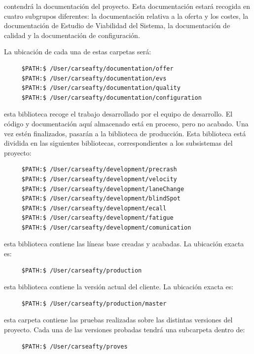\begin{description}[style=multiline, leftmargin=4cm]

  \item[\textbf{Documentación:}] contendrá la documentación del proyecto. Esta documentación estará recogida en cuatro subgrupos diferentes: la documentación relativa a la oferta y los costes, la documentación de Estudio de Viabilidad del Sistema, la documentación de calidad y la documentación de configuración.
  \par La ubicación de cada una de estas carpetas será:
  \begin{lstlisting}
     $PATH:$ /User/carseafty/documentation/offer
     $PATH:$ /User/carseafty/documentation/evs
     $PATH:$ /User/carseafty/documentation/quality
     $PATH:$ /User/carseafty/documentation/configuration
  \end{lstlisting}

  \item[\textbf{Desarrollo:}] esta biblioteca recoge el trabajo desarrollado por el equipo de desarrollo. El código y documentación aquí almacenado está en proceso, pero no acabado. Una vez estén finalizados, pasarán a la biblioteca de producción. Esta biblioteca está dividida en las siguientes bibliotecas, correspondientes a los subsistemas del proyecto:
  \begin{lstlisting}
     $PATH:$ /User/carseafty/development/precrash
     $PATH:$ /User/carseafty/development/velocity
     $PATH:$ /User/carseafty/development/laneChange
     $PATH:$ /User/carseafty/development/blindSpot
     $PATH:$ /User/carseafty/development/ecall
     $PATH:$ /User/carseafty/development/fatigue
     $PATH:$ /User/carseafty/development/comunication
  \end{lstlisting}

  \item[\textbf{Producción:}] esta biblioteca contiene las líneas base creadas y acabadas. La ubicación exacta es:
  \begin{lstlisting}
     $PATH:$ /User/carseafty/production
  \end{lstlisting}

  \item[\textbf{Maestra:}] esta biblioteca contiene la versión actual del cliente. La ubicación exacta es:
  \begin{lstlisting}
     $PATH:$ /User/carseafty/production/master
  \end{lstlisting}

  \item[\textbf{Proves:}] esta carpeta contiene las pruebas realizadas sobre las distintas versiones del proyecto. Cada una de las versiones probadas tendrá una subcarpeta dentro de:
  \begin{lstlisting}
     $PATH:$ /User/carseafty/proves
  \end{lstlisting}


\end{description}
